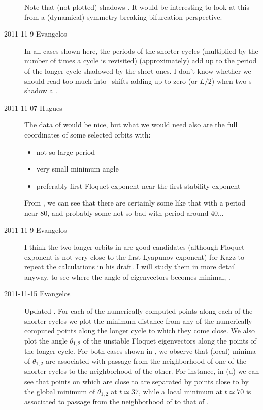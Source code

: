 \begin{description}
  Note that (not plotted) shadows . It would be interesting to look
  at this from a (dynamical) symmetry breaking bifurcation perspective.

\item[2011-11-9 Evangelos]  In all cases shown here,
  the periods of the shorter cycles (multiplied by the number of times a cycle is revisited)
  (approximately) add up to the period of the longer cycle shadowed by the short ones.
  I don't know whether we should read too much into \rpo\ shifts adding up to zero (or $L/2$)
  when two \rpo s shadow a \po.

\item[2011-11-07 Hugues] The data of  would be nice,
  but what we would need also are the full coordinates of some selected orbits with:
  \begin{itemize}
  \item not-so-large period
  \item very small minimum angle
  \item preferably first Floquet exponent near the first stability exponent
  \end{itemize}

  From , we can see that there are certainly some like
  that with a period near 80, and probably some not so bad with period around 40...


\item[2011-11-9 Evangelos] I think the two longer orbits in
   are good candidates (although Floquet exponent is
  not very close to the first Lyapunov exponent) for Kazz to repeat the
  calculations in his draft. I will study them in more detail anyway, to
  see where the angle of eigenvectors becomes minimal, \etc.

\item[2011-11-15 Evangelos] Updated . For each of
  the numerically computed points along each of the shorter cycles we plot
  the minimum distance from any of the numerically computed points along
  the longer cycle to which they come close. We also plot the angle
  $\theta_{1,2}$ of the unstable Floquet eigenvectors along the points of
  the longer cycle. For both cases shown in , we
  observe that (local) minima of $\theta_{1,2}$ are associated with passage
  from the neighborhood of one of the shorter cycles to the neighborhood of
  the other. For instance, in (d) we can see that
  points on  which are close to  are separated by
  points close to  by the global minimum of $\theta_{1,2}$ at
  $t\simeq37$, while a local minimum at $t\simeq70$ is associated to
  passage from the neighborhood of  to that of .


\end{description}
